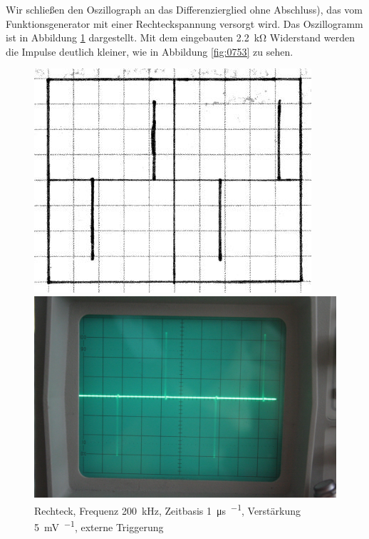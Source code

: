 Wir schließen den Oszillograph an das Differenzierglied ohne Abschluss), das
vom Funktionsgenerator mit einer Rechteckspannung versorgt wird. Das
Oszillogramm ist in Abbildung \ref{fig:0752} dargestellt. Mit dem eingebauten
\SI{2.2}{\kilo\ohm} Widerstand werden die Impulse deutlich kleiner, wie in
Abbildung \ref{fig:0753} zu sehen.

\begin{figure}
	\centering
	\begin{minipage}{.45\linewidth}
	\includegraphics[width=\linewidth]{Skizzen/IMG_0752-1500.jpg}
	\end{minipage}
	\hfill
	\begin{minipage}{.45\linewidth}
	\includegraphics[width=\linewidth]{Fotos/IMG_0752-1500.jpg}
	\end{minipage}
	\caption{%
		Rechteck, Frequenz \SI{200}{\kilo\hertz}, Zeitbasis \SI{1}{\micro\second\per\division}, Verstärkung \SI{5}{\milli\volt\per\division}, externe Triggerung
	}
	\label{fig:0752}
\end{figure}

